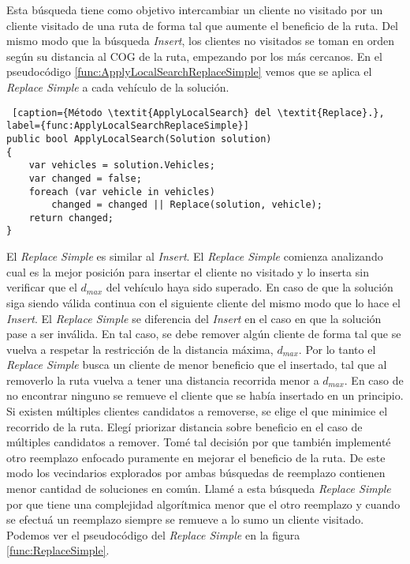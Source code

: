 Esta búsqueda tiene como objetivo intercambiar un cliente no visitado por un cliente visitado de una ruta de forma tal que aumente el beneficio de la ruta. Del mismo modo que la búsqueda \textit{Insert}, los clientes no visitados se toman en orden según su distancia al COG de la ruta, empezando por los más cercanos. En el pseudocódigo \ref{func:ApplyLocalSearchReplaceSimple} vemos que se aplica el \textit{Replace Simple} a cada vehículo de la solución.

\bigskip

\begin{minipage}{\textwidth}
\begin{lstlisting} [caption={Método \textit{ApplyLocalSearch} del \textit{Replace}.}, label={func:ApplyLocalSearchReplaceSimple}]
public bool ApplyLocalSearch(Solution solution)
{	
	var vehicles = solution.Vehicles;
	var changed = false;	
	foreach (var vehicle in vehicles)
		changed = changed || Replace(solution, vehicle);
	return changed;
}
\end{lstlisting}
\end{minipage}

\bigskip

El \textit{Replace Simple} es similar al \textit{Insert}. El \textit{Replace Simple} comienza analizando cual es la mejor posición para insertar el cliente no visitado y lo inserta sin verificar que el $d_{max}$ del vehículo haya sido superado. En caso de que la solución siga siendo válida continua con el siguiente cliente del mismo modo que lo hace el \textit{Insert}. El \textit{Replace Simple} se diferencia del \textit{Insert} en el caso en que la solución pase a ser inválida. En tal caso, se debe remover algún cliente de forma tal que se vuelva a respetar la restricción de la distancia máxima, $d_{max}$. Por lo tanto el \textit{Replace Simple} busca un cliente de menor beneficio que el insertado, tal que al removerlo la ruta vuelva a tener una distancia recorrida menor a $d_{max}$. En caso de no encontrar ninguno se remueve el cliente que se había insertado en un principio. Si existen múltiples clientes candidatos a removerse, se elige el que minimice el recorrido de la ruta. Elegí priorizar distancia sobre beneficio en el caso de múltiples candidatos a remover. Tomé tal decisión por que también implementé otro reemplazo enfocado puramente en mejorar el beneficio de la ruta. De este modo los vecindarios explorados por ambas búsquedas de reemplazo contienen menor cantidad de soluciones en común. Llamé a esta búsqueda \textit{Replace Simple} por que tiene una complejidad algorítmica menor que el otro reemplazo y cuando se efectuá un reemplazo siempre se remueve a lo sumo un cliente visitado. Podemos ver el pseudocódigo del \textit{Replace Simple} en la figura \ref{func:ReplaceSimple}.


